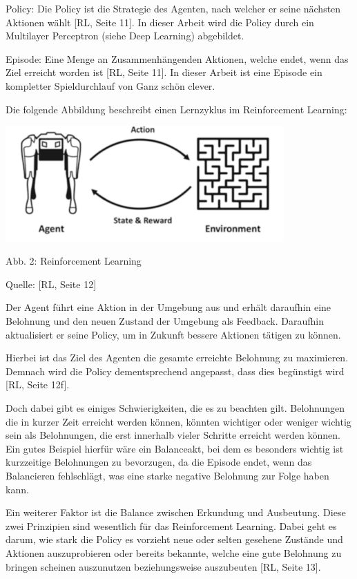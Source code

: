 Policy: Die Policy ist die Strategie des Agenten, nach welcher er seine nächsten Aktionen wählt [RL, Seite 11]. In dieser Arbeit wird die Policy durch ein Multilayer Perceptron (siehe Deep Learning) abgebildet.

Episode: Eine Menge an Zusammenhängenden Aktionen, welche endet, wenn das Ziel erreicht worden ist [RL, Seite 11]. In dieser Arbeit ist eine Episode ein kompletter Spieldurchlauf von Ganz schön clever.

\begin{minipage}{\linewidth}
	Die folgende Abbildung beschreibt einen Lernzyklus im Reinforcement Learning:

	\vspace{0.5cm}
	\includegraphics[width=0.8\textwidth]{Bilder/rl}
	
	Abb. 2: Reinforcement Learning
	
	Quelle: [RL, Seite 12]\\
\end{minipage}

Der Agent führt eine Aktion in der Umgebung aus und erhält daraufhin eine Belohnung und den neuen Zustand der Umgebung als Feedback. Daraufhin aktualisiert er seine Policy, um in Zukunft bessere Aktionen tätigen zu können.

Hierbei ist das Ziel des Agenten die gesamte erreichte Belohnung zu maximieren. Demnach wird die Policy dementsprechend angepasst, dass dies begünstigt wird [RL, Seite 12f].

Doch dabei gibt es einiges Schwierigkeiten, die es zu beachten gilt. Belohnungen die in kurzer Zeit erreicht werden können, könnten wichtiger oder weniger wichtig sein als Belohnungen, die erst innerhalb vieler Schritte erreicht werden können. Ein gutes Beispiel hierfür wäre ein Balanceakt, bei dem es besonders wichtig ist kurzzeitige Belohnungen zu bevorzugen, da die Episode endet, wenn das Balancieren fehlschlägt, was eine starke negative Belohnung zur Folge haben kann.

Ein weiterer Faktor ist die Balance zwischen Erkundung und Ausbeutung. Diese zwei Prinzipien sind wesentlich für das Reinforcement Learning. Dabei geht es darum, wie stark die Policy es vorzieht neue oder selten gesehene Zustände und Aktionen auszuprobieren oder bereits bekannte, welche eine gute Belohnung zu bringen scheinen auszunutzen beziehungsweise auszubeuten [RL, Seite 13].
